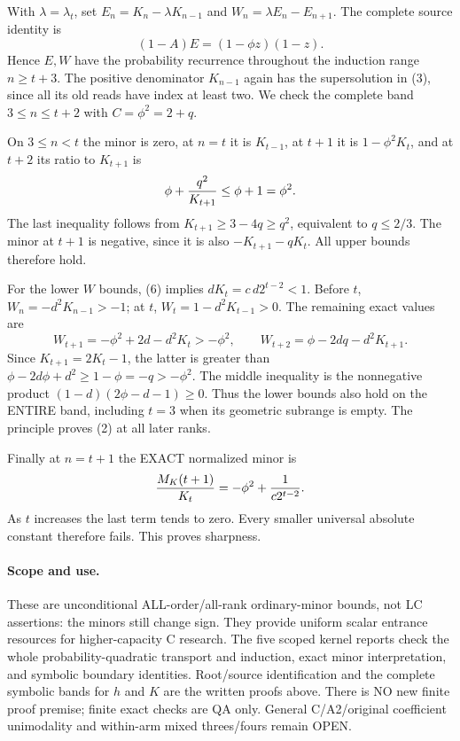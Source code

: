 With $\lambda=\lambda_t$, set
$E_n=K_n-\lambda K_{n-1}$ and $W_n=\lambda E_n-E_{n+1}$.
The complete source identity is
\[
                   (1-A)E=(1-\phi z)(1-z).
\]
Hence $E,W$ have the probability recurrence throughout the induction
range $n\ge t+3$. The positive denominator $K_{n-1}$ again has
the supersolution in (3), since all its old reads have index at least two.
We check the complete band $3\le n\le t+2$ with $C=\phi^2=2+q$.

On $3\le n<t$ the minor is zero, at $n=t$ it is $K_{t-1}$,
at $t+1$ it is $1-\phi^2K_t$, and at $t+2$ its ratio to
$K_{t+1}$ is
\[
                     \phi+{q^2\over K_{t+1}}\le\phi+1=\phi^2.
\]
The last inequality follows from $K_{t+1}\ge3-4q\ge q^2$,
equivalent to $q\le2/3$. The minor at $t+1$ is negative, since
it is also $-K_{t+1}-qK_t$. All upper bounds therefore hold.

For the lower $W$ bounds, (6) implies
$dK_t=c\,d2^{t-2}<1$. Before $t$, $W_n=-d^2K_{n-1}>-1$;
at $t$, $W_t=1-d^2K_{t-1}>0$. The remaining exact values are
\[
 W_{t+1}=-\phi^2+2d-d^2K_t>-\phi^2,
\qquad
 W_{t+2}=\phi-2dq-d^2K_{t+1}.
\]
Since $K_{t+1}=2K_t-1$, the latter is greater than
$\phi-2d\phi+d^2\ge1-\phi=-q>-\phi^2$.
The middle inequality is the nonnegative product
$(1-d)(2\phi-d-1)\ge0$. Thus the lower bounds also hold on
the ENTIRE band, including $t=3$ when its geometric subrange is empty.
The principle proves (2) at all later ranks.

Finally at $n=t+1$ the EXACT normalized minor is
\[
 {M_K(t+1)\over K_t}=-\phi^2+{1\over c2^{t-2}}.
\]
As $t$ increases the last term tends to zero. Every smaller
universal absolute constant therefore fails. This proves sharpness.

\paragraph{Scope and use.}
These are unconditional ALL-order/all-rank ordinary-minor bounds,
not LC assertions: the minors still change sign. They provide
uniform scalar entrance resources for higher-capacity C research.
The five scoped kernel reports check the whole probability-quadratic
transport and induction, exact minor interpretation, and symbolic
boundary identities. Root/source identification and the complete
symbolic bands for $h$ and $K$ are the written proofs above.
There is NO new finite proof premise; finite exact checks are QA only.
General C/A2/original coefficient unimodality and within-arm mixed
threes/fours remain OPEN.
